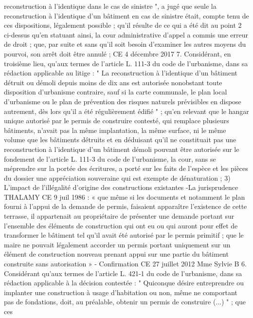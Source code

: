 \documentclass[11pt,a4paper]{report}
\begin{document}
	reconstruction à l'identique dans le cas de sinistre ", a jugé que seule la reconstruction à l'identique d'un
	bâtiment en cas de sinistre était, compte tenu de ces dispositions, légalement possible ; qu'il résulte de ce qui a
	été dit au point 2 ci-dessus qu'en statuant ainsi, la cour administrative d'appel a commis une erreur de droit ;
	que, par suite et sans qu'il soit besoin d'examiner les autres moyens du pourvoi, son arrêt doit être annulé ;
	CE 4 décembre 2017  7. Considérant, en troisième lieu, qu'aux termes de l'article L. 111-3 du
	code de l'urbanisme, dans sa rédaction applicable au litige : " La reconstruction à l'identique d'un bâtiment
	détruit ou démoli depuis moins de dix ans est autorisée nonobstant toute disposition d'urbanisme contraire, sauf
	si la carte communale, le plan local d'urbanisme ou le plan de prévention des risques naturels prévisibles en
	dispose autrement, dès lors qu'il a été régulièrement édifié " ; qu'en relevant que le hangar unique autorisé par
	le permis de construire contesté, qui remplace plusieurs bâtiments, n'avait pas la même implantation, la même
	surface, ni le même volume que les bâtiments détruits et en déduisant qu'il ne constituait pas une reconstruction
	à l'identique d'un bâtiment démoli pouvant être autorisée sur le fondement de l'article L. 111-3 du code de
	l'urbanisme, la cour, sans se méprendre sur la portée des écritures, a porté sur les faits de l'espèce et les pièces
	du dossier une appréciation souveraine qui est exempte de dénaturation ;
	3) L’impact de l’illégalité d’origine des constructions existantes
	-La jurisprudence THALAMY CE 9 juil 1986  : « que même si les documents et notamment le plan
	fourni à l'appui de la demande de permis, faisaient apparaître l'existence de cette terrasse, il appartenait au
	propriétaire de présenter une demande portant sur l'ensemble des éléments de construction qui ont eu ou qui
	auront pour effet de transformer le bâtiment tel qu'il avait été autorisé par le permis primitif ; que le maire ne
	pouvait légalement accorder un permis portant uniquement sur un élément de construction nouveau prenant
	appui sur une partie du bâtiment construite sans autorisation »
	- Confirmation CE 27 juillet 2012 Mme Sylvie B 
	6. Considérant qu'aux termes de l'article L. 421-1 du code de l'urbanisme, dans sa rédaction applicable à la
	décision contestée : " Quiconque désire entreprendre ou implanter une construction à usage d'habitation ou non,
	même ne comportant pas de fondations, doit, au préalable, obtenir un permis de construire (...) " ; que ces
\end{document}
